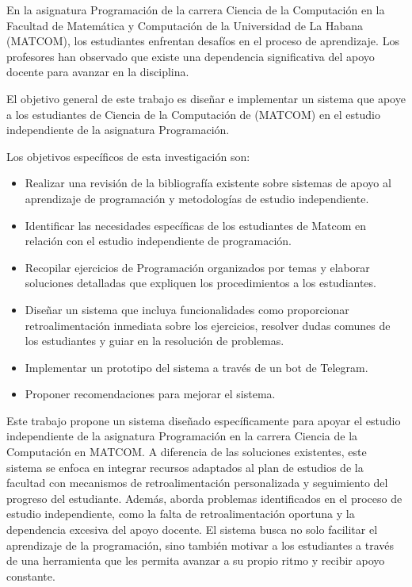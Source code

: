 En la asignatura Programación de la carrera Ciencia de la Computación en la Facultad de Matemática y Computación de la Universidad de La Habana (\mbox{MATCOM}), los estudiantes enfrentan desafíos en el proceso de aprendizaje. Los profesores han observado que existe una dependencia significativa del apoyo docente para avanzar en la disciplina.

El objetivo general de este trabajo es diseñar e implementar un sistema que apoye a los estudiantes de Ciencia de la Computación de (\mbox{MATCOM}) en el estudio independiente de la asignatura Programación.

Los objetivos específicos de esta investigación son:
\begin{itemize}
    \item Realizar una revisión de la bibliografía existente sobre sistemas de apoyo al aprendizaje de programación y metodologías de estudio independiente.
    \item Identificar las necesidades específicas de los estudiantes de Matcom en relación con el estudio independiente de programación.
    \item Recopilar ejercicios de Programación organizados por temas y elaborar soluciones detalladas que expliquen los procedimientos a los estudiantes.
    \item Diseñar un sistema que incluya funcionalidades como proporcionar retroalimentación inmediata sobre los ejercicios, resolver dudas comunes de los estudiantes y guiar en la resolución de problemas.
    \item Implementar un prototipo del sistema a través de un bot de Telegram.
    \item Proponer recomendaciones para mejorar el sistema.
\end{itemize}

Este trabajo propone un sistema diseñado específicamente para apoyar el estudio independiente de la asignatura Programación en la carrera Ciencia de la Computación en \mbox{MATCOM}. A diferencia de las soluciones existentes, este sistema se enfoca en integrar recursos adaptados al plan de estudios de la facultad con mecanismos de retroalimentación personalizada y seguimiento del progreso del estudiante. Además, aborda problemas identificados en el proceso de estudio independiente, como la falta de retroalimentación oportuna y la dependencia excesiva del apoyo docente. El sistema busca no solo facilitar el aprendizaje de la programación, sino también motivar a los estudiantes a través de una herramienta que les permita avanzar a su propio ritmo y recibir apoyo constante.

